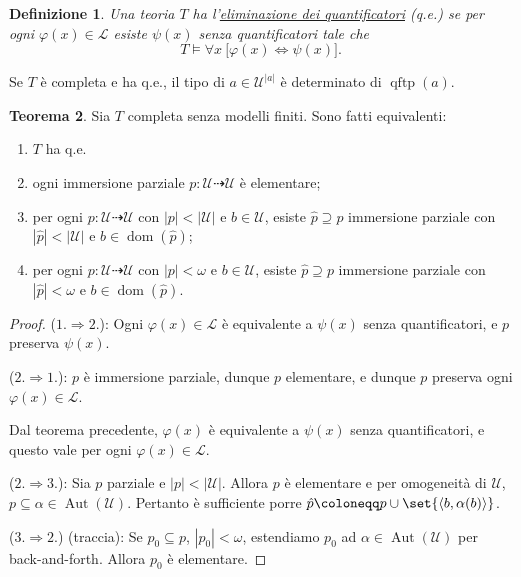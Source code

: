 \documentclass[10pt]{article}
\newcommand{\card}[1]{\left\vert #1 \right\vert}
\newcommand{\1}{\mathds{1}}
\newcommand{\partialto}{\dashrightarrow}
\theoremstyle{definition}%
\newtheorem{thm}{Teorema}[section]
\theoremstyle{plain}
\newtheorem{definizione}[thm]{Definizione}
\theoremstyle{remark}
\begin{document}
\begin{definizione}
Una teoria \(T\) ha l'\uline{eliminazione dei quantificatori} (q.e.) se per ogni \(\varphi(x) \in \mathcal{L}\) esiste \(\psi(x)\) senza quantificatori tale che
\begin{equation*}
T\vDash \forall x\ \big[\varphi(x)\iff\psi(x)\big].
\end{equation*}
\end{definizione}

Se \(T\) è completa e ha q.e., il tipo di \(a \in \mathcal{U}^{|a|}\) è determinato di \(\operatorname{qftp}(a)\).

\begin{thm}
Sia \(T\) completa senza modelli finiti. Sono fatti equivalenti:
\begin{enumerate}
\item \(T\) ha q.e.
\item ogni immersione parziale \(p:\mathcal{U}\partialto \mathcal{U}\) è elementare;
\item per ogni \(p:\mathcal{U}\partialto\mathcal{U}\) con \(\card{p}<\card{\mathcal{U}}\) e \(b \in \mathcal{U}\), esiste \(\hat{p}\supseteq p\) immersione parziale con \(\card{\hat{p}}<\card{\mathcal{U}}\) e \(b \in \operatorname{dom}(\hat{p})\);
\item per ogni \(p:\mathcal{U}\partialto\mathcal{U}\) con \(\card{p}<\omega\) e \(b \in \mathcal{U}\), esiste \(\hat{p}\supseteq p\) immersione parziale con \(\card{\hat{p}}<\omega\) e \(b \in \operatorname{dom}(\hat{p})\).
\end{enumerate}
\end{thm}
\begin{proof}
(\(1.\Rightarrow 2.\)): Ogni \(\varphi(x) \in \mathcal{L}\) è equivalente a \(\psi(x)\) senza quantificatori, e \(p\) preserva \(\psi(x)\).

(\(2.\Rightarrow 1.\)): \(p\) è immersione parziale, dunque \(p\) elementare, e dunque \(p\) preserva ogni \(\varphi(x) \in \mathcal{L}\).

Dal teorema precedente, \(\varphi(x)\) è equivalente a \(\psi(x)\) senza quantificatori, e questo vale per ogni \(\varphi(x) \in \mathcal{L}\).

(\(2.\Rightarrow 3.\)): Sia \(p\) parziale e \(\card{p}<\card{\mathcal{U}}\). Allora \(p\) è elementare e per omogeneità di \(\mathcal{U}\), \(p \subseteq \alpha \in \operatorname{Aut}(\mathcal{U})\). Pertanto è sufficiente porre \(\hat{p}\coloneqq p\cup\set{\langle b,\alpha(b)\rangle}\).

(\(3.\Rightarrow 2.\)) (traccia): Se \(p_{0}\subseteq p\), \(\card{p_{0}}<\omega\), estendiamo \(p_{0}\) ad \(\alpha \in \operatorname{Aut}(\mathcal{U})\) per back-and-forth. Allora \(p_{0}\) è elementare.
\end{proof}
\end{document}
